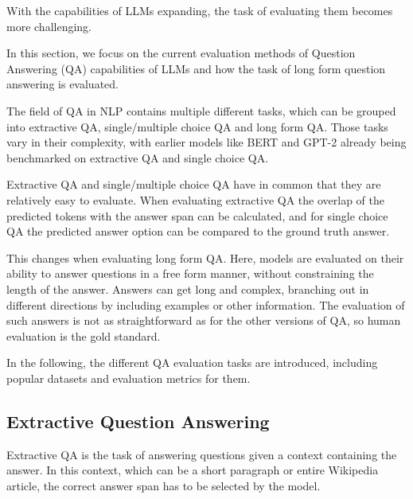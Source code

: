 With the capabilities of LLMs expanding, the task of evaluating them becomes more challenging.

In this section, we focus on the current evaluation methods of Question Answering (QA) capabilities of LLMs and how the task of long form question answering is evaluated.

The field of QA in NLP contains multiple different tasks, which can be grouped into extractive QA, single/multiple choice QA and long form QA.
Those tasks vary in their complexity, with earlier models like BERT and GPT-2 already being benchmarked on extractive QA and single choice QA.

Extractive QA and single/multiple choice QA have in common that they are relatively easy to evaluate.
When evaluating extractive QA the overlap of the predicted tokens with the answer span can be calculated, and for single choice QA the predicted answer option can be compared to the ground truth answer.

This changes when evaluating long form QA.
Here, models are evaluated on their ability to answer questions in a free form manner, without constraining the length of the answer.
Answers can get long and complex, branching out in different directions by including examples or other information.
The evaluation of such answers is not as straightforward as for the other versions of QA, so human evaluation is the gold standard.

In the following, the different QA evaluation tasks are introduced, including popular datasets and evaluation metrics for them.

\subsection{Extractive Question Answering}\label{sec:extractive-qa}
Extractive QA is the task of answering questions given a context containing the answer.
In this context, which can be a short paragraph or entire Wikipedia article, the correct answer span has to be selected by the model.


